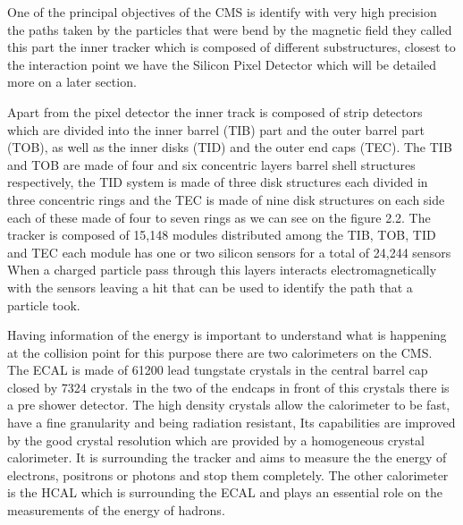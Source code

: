 One of the principal objectives of the CMS is identify with very high precision the paths taken by the particles that were bend by the magnetic field they called this part the inner tracker which is composed of different substructures, closest to the interaction point we have the Silicon Pixel Detector which will be detailed more on a later section.

Apart from the pixel detector the inner track is composed of strip detectors which are divided into the inner barrel (TIB) part and the outer barrel part (TOB), as well as the inner disks (TID) and the outer end caps (TEC). The TIB and TOB are made of four and six concentric layers barrel shell structures respectively, the TID system is made of three disk structures each divided in three concentric rings and the TEC is made of nine disk structures on each side each of these made of four to seven rings as we can see on the figure 2.2. The tracker is composed of 15,148 modules distributed among the TIB, TOB, TID and TEC each module has one or two silicon sensors for a total of 24,244 sensors  When a charged particle pass through this layers interacts electromagnetically with the sensors leaving a hit that can be used to identify the path that a particle took. \cite{CMS1}



Having information of the energy is important to understand what is happening at the collision point for this purpose there are two calorimeters on the CMS. The ECAL is made of 61200 lead tungstate crystals in the central barrel cap closed by 7324 crystals in the two of the endcaps in front of this crystals there is a pre shower detector. The high density crystals allow the calorimeter to be fast, have a fine granularity and being radiation resistant, Its capabilities are improved by the good crystal resolution which are provided by a homogeneous crystal calorimeter. It is surrounding the tracker and aims to measure the the energy of electrons, positrons or photons and stop them completely. The other calorimeter is the HCAL which is surrounding the ECAL and plays an essential role on the measurements of the energy of hadrons.

